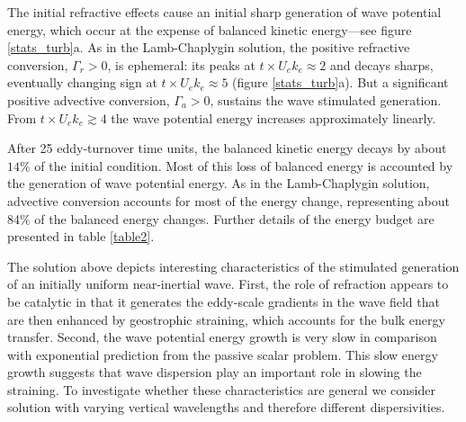 \documentclass{jfm}
\begin{document}
The initial refractive effects cause an initial sharp generation of wave potential
energy, which occur at the expense of balanced kinetic energy---see
figure \ref{stats_turb}a. As in the Lamb-Chaplygin solution, the positive refractive
conversion, $\Gamma_r > 0$, is ephemeral: its peaks at $t\times U_e k_e \approx 2$ and decays
sharps, eventually changing sign at $t\times U_e k_e \approx 5$ (figure \ref{stats_turb}a).
But a significant positive advective conversion, $\Gamma_a> 0$, sustains the
wave stimulated generation. From $t\times U_e k_e \gtrsim 4$ the wave potential energy
increases approximately linearly.

After 25 eddy-turnover time units, the balanced kinetic energy decays by about
$14 \%$ of the initial condition. Most of this loss of balanced energy is accounted
by the generation of wave potential energy. As in the Lamb-Chaplygin solution,
advective conversion accounts for most of the energy change, representing about
84$\%$ of the balanced energy changes. Further details of the energy budget are
presented in table \ref{table2}.

The solution above depicts interesting characteristics of the stimulated generation
of an initially uniform near-inertial wave. First, the role of refraction appears
to be catalytic in that it generates the eddy-scale gradients in the wave field
that are then enhanced by geostrophic straining, which accounts for the bulk
energy transfer. Second, the wave potential energy growth is very slow in comparison
with exponential prediction from the passive scalar problem. This slow energy
growth suggests that wave dispersion play an important role in slowing the
straining. To investigate whether these characteristics are general we consider
solution with varying vertical wavelengths and therefore different dispersivities.

\end{document}
